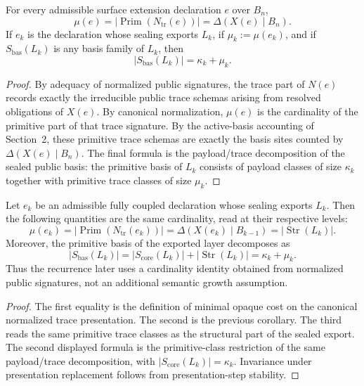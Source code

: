 \begin{corollary}
For every admissible surface extension declaration \(e\) over \(B_n\),
\[
  \mu(e)
  = \left|\operatorname{Prim}(N_{\mathrm{tr}}(e))\right|
  = \Delta(X(e)\mid B_n).
\]
If \(e_k\) is the declaration whose sealing exports \(L_k\), if
\(\mu_k:=\mu(e_k)\), and if \(S_{\mathrm{bas}}(L_k)\) is any basis family of \(L_k\), then
\[
  |S_{\mathrm{bas}}(L_k)| = \kappa_k + \mu_k.
\]
\end{corollary}

\begin{proof}
By adequacy of normalized public signatures, the trace part of \(N(e)\) records exactly the
irreducible public trace schemas arising from resolved obligations of \(X(e)\).  By canonical
normalization, \(\mu(e)\) is the cardinality of the primitive part of that trace signature.  By
the active-basis accounting of Section~2, these primitive trace schemas are exactly the basis
sites counted by \(\Delta(X(e)\mid B_n)\).  The final formula is the payload/trace decomposition
of the sealed public basis: the primitive basis of \(L_k\) consists of payload classes of size
\(\kappa_k\) together with primitive trace classes of size \(\mu_k\).
\end{proof}

\begin{lemma}
Let \(e_k\) be an admissible fully coupled declaration whose sealing exports \(L_k\).  Then
the following quantities are the same cardinality, read at their respective levels:
\[
  \mu(e_k)
  = \left|\operatorname{Prim}(N_{\mathrm{tr}}(e_k))\right|
  = \Delta(X(e_k)\mid B_{k-1})
  = |\operatorname{Str}(L_k)|.
\]
Moreover, the primitive basis of the exported layer decomposes as
\[
  |S_{\mathrm{bas}}(L_k)|
  = |S_{\mathrm{core}}(L_k)| + |\operatorname{Str}(L_k)|
  = \kappa_k + \mu_k.
\]
Thus the recurrence later uses a cardinality identity obtained from normalized public
signatures, not an additional semantic growth assumption.
\end{lemma}

\begin{proof}
The first equality is the definition of minimal opaque cost on the canonical normalized trace
presentation.  The second is the previous corollary.  The third reads the same primitive
trace classes as the structural part of the sealed export.  The second displayed formula is
the primitive-class restriction of the same payload/trace decomposition, with
\(|S_{\mathrm{core}}(L_k)|=\kappa_k\).  Invariance under presentation replacement follows from
presentation-step stability.
\end{proof}

